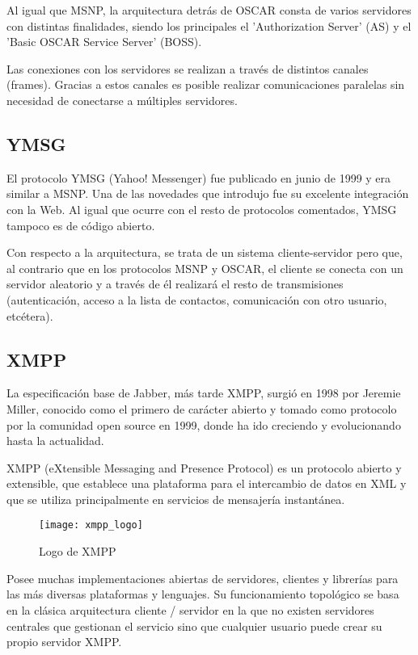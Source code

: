Al igual que MSNP, la arquitectura detrás de OSCAR consta de varios servidores con distintas finalidades, siendo los principales el 'Authorization Server' (AS) y el 'Basic OSCAR Service Server' (BOSS).

Las conexiones con los servidores se realizan a través de distintos canales (frames). Gracias a estos canales es posible realizar comunicaciones paralelas sin necesidad de conectarse a múltiples servidores.

\subsection{YMSG}

El protocolo YMSG (Yahoo! Messenger) fue publicado en junio de 1999 y era similar a MSNP. Una de las novedades que introdujo fue su excelente integración con la Web. Al igual que ocurre con el resto de protocolos comentados, YMSG tampoco es de código abierto.

Con respecto a la arquitectura, se trata de un sistema cliente-servidor pero que, al contrario que en los protocolos MSNP y OSCAR, el cliente se conecta con un servidor aleatorio y a través de él realizará el resto de transmisiones (autenticación, acceso a la lista de contactos, comunicación con otro usuario, etcétera).

\subsection{XMPP}

La especificación base de Jabber, más tarde XMPP, surgió en 1998 por Jeremie Miller, conocido como el primero de carácter abierto y tomado como protocolo por la comunidad open source en 1999, donde ha ido creciendo y evolucionando hasta la actualidad.

XMPP (eXtensible Messaging and Presence Protocol) es un protocolo abierto y extensible, que establece una plataforma para el intercambio de datos en XML y que se utiliza principalmente en servicios de mensajería instantánea.

\begin{figure}[htp!]
  \centering
  \texttt{[image: xmpp\_logo]}
  \caption{Logo de XMPP}
  \label{fig:xmpp_logo}
\end{figure}

Posee muchas implementaciones abiertas de servidores, clientes y librerías para las más diversas plataformas y lenguajes. Su funcionamiento topológico se basa en la clásica arquitectura cliente / servidor en la que no existen servidores centrales que gestionan el servicio sino que cualquier usuario puede crear su propio servidor XMPP.

